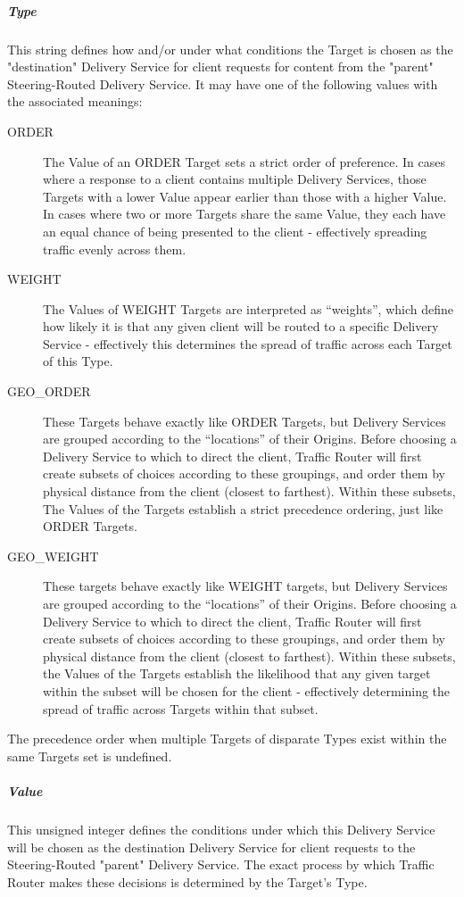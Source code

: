 \subparagraph{Type}
This string defines how and/or under what conditions the Target is chosen as the
"destination" Delivery Service for client requests for content from the "parent"
Steering-Routed Delivery Service. It may have one of the following values with
the associated meanings:

\begin{description}
	\item[ORDER] The Value of an ORDER Target sets a strict order of preference.
	In cases where a response to a client contains multiple Delivery Services,
	those Targets with a lower Value appear earlier than those with a higher
	Value. In cases where two or more Targets share the same Value, they each
	have an equal chance of being presented to the client - effectively
	spreading traffic evenly across them.
	\item[WEIGHT] The Values of WEIGHT Targets are interpreted as “weights”,
	which define how likely it is that any given client will be routed to a
	specific Delivery Service - effectively this determines the spread of
	traffic across each Target of this Type.
	\item[GEO\_ORDER] These Targets behave exactly like ORDER Targets, but
	Delivery Services are grouped according to the “locations” of their Origins.
	Before choosing a Delivery Service to which to direct the client, Traffic
	Router will first create subsets of choices according to these groupings,
	and order them by physical distance from the client (closest to farthest).
	Within these subsets, The Values of the Targets establish a strict
	precedence ordering, just like ORDER Targets.
	\item[GEO\_WEIGHT] These targets behave exactly like WEIGHT targets, but
	Delivery Services are grouped according to the “locations” of their Origins.
	Before choosing a Delivery Service to which to direct the client, Traffic
	Router will first create subsets of choices according to these groupings,
	and order them by physical distance from the client (closest to farthest).
	Within these subsets, the Values of the Targets establish the likelihood
	that any given target within the subset will be chosen for the client -
	effectively determining the spread of traffic across Targets within that
	subset.
\end{description}

The precedence order when multiple Targets of disparate Types exist within the
same Targets set is undefined.

\subparagraph{Value}
This unsigned integer defines the conditions under which this Delivery Service
will be chosen as the destination Delivery Service for client requests to the
Steering-Routed "parent" Delivery Service. The exact process by which Traffic
Router makes these decisions is determined by the Target's Type.

